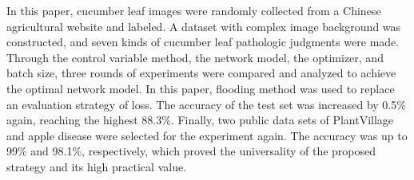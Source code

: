 \documentclass[a4paper,fleqn]{cas-sc}
\begin{document}
In this paper, cucumber leaf images were randomly collected from a Chinese agricultural website and labeled. A dataset with complex image background was constructed, and seven kinds of cucumber leaf pathologic judgments were made. Through the control variable method, the network model, the optimizer, and batch size, three rounds of experiments were compared and analyzed to achieve the optimal network model. In this paper, flooding method was used to replace an evaluation strategy of loss. The accuracy of the test set was increased by 0.5\% again, reaching the highest 88.3\%. Finally, two public data sets of PlantVillage and apple disease were selected for the experiment again. The accuracy was up to 99\% and 98.1\%, respectively, which proved the universality of the proposed strategy and its high practical value.


 
\end{document}
